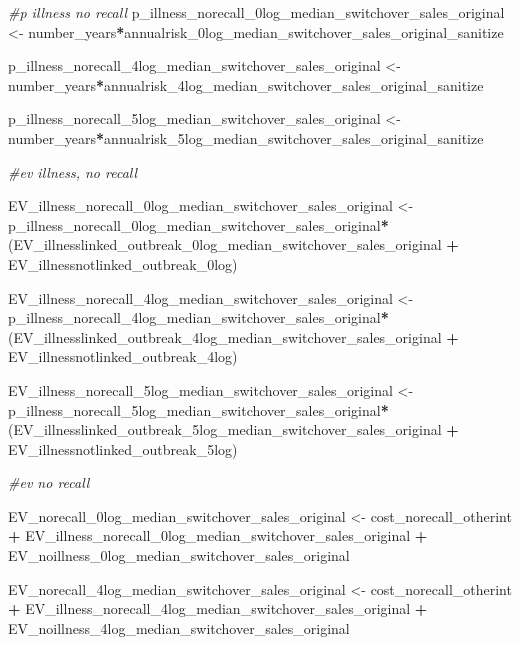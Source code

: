 \documentclass[
]{article}
\newenvironment{Shaded}{\begin{snugshade}}{\end{snugshade}}
\newcommand{\CommentTok}[1]{\textcolor[rgb]{0.56,0.35,0.01}{\textit{#1}}}
\newcommand{\NormalTok}[1]{#1}
\newcommand{\OtherTok}[1]{\textcolor[rgb]{0.56,0.35,0.01}{#1}}
\newcommand{\SpecialCharTok}[1]{\textcolor[rgb]{0.81,0.36,0.00}{\textbf{#1}}}
\begin{document}
\begin{Shaded}
\begin{Highlighting}[]
\CommentTok{\#p illness no recall}
\NormalTok{p\_illness\_norecall\_0log\_median\_switchover\_sales\_original }\OtherTok{\textless{}{-}}\NormalTok{ number\_years}\SpecialCharTok{*}\NormalTok{annualrisk\_0log\_median\_switchover\_sales\_original\_sanitize }

\NormalTok{p\_illness\_norecall\_4log\_median\_switchover\_sales\_original }\OtherTok{\textless{}{-}}\NormalTok{ number\_years}\SpecialCharTok{*}\NormalTok{annualrisk\_4log\_median\_switchover\_sales\_original\_sanitize }

\NormalTok{p\_illness\_norecall\_5log\_median\_switchover\_sales\_original }\OtherTok{\textless{}{-}}\NormalTok{ number\_years}\SpecialCharTok{*}\NormalTok{annualrisk\_5log\_median\_switchover\_sales\_original\_sanitize }


\CommentTok{\#ev illness, no recall}

\NormalTok{EV\_illness\_norecall\_0log\_median\_switchover\_sales\_original }\OtherTok{\textless{}{-}}\NormalTok{ p\_illness\_norecall\_0log\_median\_switchover\_sales\_original}\SpecialCharTok{*}\NormalTok{(EV\_illnesslinked\_outbreak\_0log\_median\_switchover\_sales\_original }\SpecialCharTok{+}\NormalTok{ EV\_illnessnotlinked\_outbreak\_0log)}

\NormalTok{EV\_illness\_norecall\_4log\_median\_switchover\_sales\_original }\OtherTok{\textless{}{-}}\NormalTok{ p\_illness\_norecall\_4log\_median\_switchover\_sales\_original}\SpecialCharTok{*}\NormalTok{(EV\_illnesslinked\_outbreak\_4log\_median\_switchover\_sales\_original }\SpecialCharTok{+}\NormalTok{ EV\_illnessnotlinked\_outbreak\_4log)}

\NormalTok{EV\_illness\_norecall\_5log\_median\_switchover\_sales\_original }\OtherTok{\textless{}{-}}\NormalTok{ p\_illness\_norecall\_5log\_median\_switchover\_sales\_original}\SpecialCharTok{*}\NormalTok{(EV\_illnesslinked\_outbreak\_5log\_median\_switchover\_sales\_original }\SpecialCharTok{+}\NormalTok{ EV\_illnessnotlinked\_outbreak\_5log)}


\CommentTok{\#ev no recall}

\NormalTok{EV\_norecall\_0log\_median\_switchover\_sales\_original }\OtherTok{\textless{}{-}}\NormalTok{ cost\_norecall\_otherint }\SpecialCharTok{+}\NormalTok{ EV\_illness\_norecall\_0log\_median\_switchover\_sales\_original }\SpecialCharTok{+}\NormalTok{ EV\_noillness\_0log\_median\_switchover\_sales\_original}

\NormalTok{EV\_norecall\_4log\_median\_switchover\_sales\_original }\OtherTok{\textless{}{-}}\NormalTok{ cost\_norecall\_otherint }\SpecialCharTok{+}\NormalTok{ EV\_illness\_norecall\_4log\_median\_switchover\_sales\_original }\SpecialCharTok{+}\NormalTok{ EV\_noillness\_4log\_median\_switchover\_sales\_original}


\end{Highlighting}
\end{Shaded}
\end{document}
